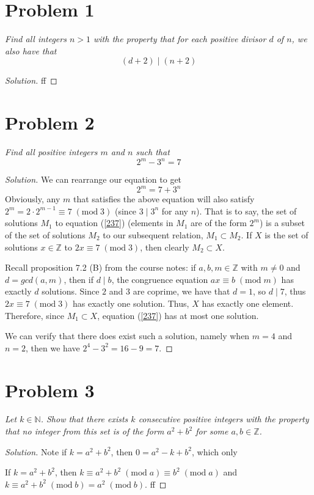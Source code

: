 \documentclass{article}
\newcommand{\N}{{\mathbb N}}
\newcommand{\Z}{{\mathbb Z}}
\begin{document}
\section{Problem 1}
{\it Find all integers $n>1$ with the property that for each positive
divisor $d$ of $n$, we also have that
\[
	(d+2)\mid(n+2)
\]
}
\begin{proof}[Solution]
	ff
\end{proof}
\clearpage

\section{Problem 2}
{\it Find all positive integers $m$ and $n$ such that
\[
	2^m - 3^n = 7
\]
}
\begin{proof}[Solution]
	We can rearrange our equation to get
	\begin{equation}\label{237}
		2^m = 7 + 3^n
	\end{equation}
	Obviously, any $m$ that satisfies the above equation
	will also satisfy $2^m = 2\cdot2^{m-1} \equiv 7 \; (\mathrm{mod} \; 3)$
	(since $3 \mid 3^n$ for any $n$).
	That is to say, the set of solutions $M_1$ to equation (\ref{237})
	(elements in $M_1$ are of the form $2^m$)
	is a subset of the set of solutions $M_2$ to our subsequent relation,
	$M_1 \subset M_2$.
	If $X$ is the set of solutions $x\in\Z$ to $2x \equiv 7 \; (\mathrm{mod} \; 3)$,
	then clearly $M_2 \subset X$.

	Recall proposition 7.2 (B) from the course notes: if $a,b,m \in \Z$ with $m\neq0$
	and $d = gcd(a,m)$,
	then if $d \mid b$, the congruence equation $ax \equiv b \; (\mathrm{mod} \; m)$
	has exactly $d$ solutions.
	Since $2$ and $3$ are coprime, we have that $d = 1$,
	so $d \mid 7$,
	thus $2x \equiv 7 \; (\mathrm{mod} \; 3)$
	has exactly one solution.
	Thus, $X$ has exactly one element.
	Therefore, since $M_1 \subset X$,
	equation (\ref{237}) has at most one solution.

	We can verify that there does exist such a solution,
	namely when $m = 4$ and $n = 2$,
	then we have $2^4 - 3^2 = 16 - 9 = 7$.
\end{proof}
\clearpage

\section{Problem 3}
{\it Let $k \in \N$. Show that there exists $k$ consecutive positive integers
with the property that no integer from this set is of the form
$a^2 + b^2$ for some $a,b \in \Z$.}
\begin{proof}[Solution]
	Note if $k = a^2 + b^2$,
	then $0 = a^2 - k + b^2$,
	which only

	If $k = a^2 + b^2$,
	then $k \equiv a^2 + b^2\;(\mathrm{mod}\; a) \equiv b^2 \; (\mathrm{mod}\; a)$
	and $k \equiv a^2 + b^2\;(\mathrm{mod}\; b) = a^2 \; (\mathrm{mod}\; b)$.
	ff
\end{proof}
\clearpage
\end{document}
